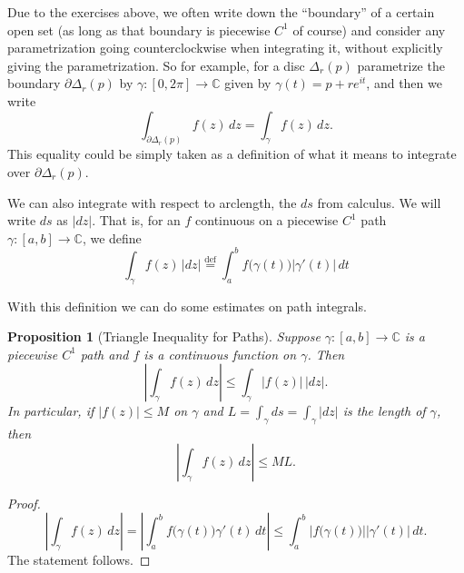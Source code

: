 \documentclass[12pt,openany]{book}
\newcommand{\sabs}[1]{\lvert {#1} \rvert}
\newcommand{\abs}[1]{\left\lvert {#1} \right\rvert}
\newcommand{\C}{{\mathbb{C}}}
\theoremstyle{plain}
\newtheorem{prop}[thm]{Proposition}
\theoremstyle{remark}
\theoremstyle{definition}
\theoremstyle{exercise}
\theoremstyle{example}
\begin{document}
Due to the exercises above,
we often write down the ``boundary'' of a certain open set
(as long as that boundary is piecewise $C^1$ of course)
and consider any parametrization going counterclockwise
when integrating it, without explicitly giving the parametrization.
So for example, for a disc $\Delta_r(p)$ parametrize
the boundary $\partial \Delta_r(p)$ by
$\gamma  \colon [0,2\pi] \to \C$ given by $\gamma(t) = p +
re^{it}$, and then we write
\begin{equation*}
\int_{\partial \Delta_r(p)} f(z) \, dz
=
\int_{\gamma} f(z) \, dz .
\end{equation*}
This equality could be simply taken as a definition of what it means to
integrate over $\partial \Delta_r(p)$.

\medskip

We can also integrate with respect to arclength, the $ds$ from calculus.
We will write $ds$ as $\sabs{dz}$.  That is, for an $f$ continuous on
a piecewise $C^1$ path $\gamma \colon [a,b] \to \C$,
we define
\begin{equation*}
\int_\gamma f(z) \, \sabs{dz}
\overset{\text{def}}{=}
\int_a^b f\bigl( \gamma(t) \bigr) \sabs{\gamma'(t)} \, dt
\end{equation*}

With this definition we can do some estimates on path integrals.

\begin{prop}[Triangle Inequality for Paths]
\pagebreak[2]
Suppose $\gamma \colon [a,b] \to \C$ is 
a piecewise $C^1$ path and $f$ is a continuous function on
$\gamma$.  Then
\begin{equation*}
\abs{\int_\gamma f(z) \, dz} \leq \int_\gamma \sabs{f(z)} \, \sabs{dz} .
\end{equation*}
In particular, if $\sabs{f(z)} \leq M$ on $\gamma$ and $L = \int_\gamma ds
= \int_{\gamma} \sabs{dz}$ is the length of $\gamma$, then
\begin{equation*}
\abs{\int_\gamma f(z) \, dz} \leq ML .
\end{equation*}
\end{prop} 

\begin{proof}
\begin{equation*}
\abs{\int_\gamma f(z) \, dz}
=
\abs{\int_a^b f\bigl( \gamma(t) \bigr) \gamma'(t) \, dt}
\leq
\int_a^b \abs{ f\bigl( \gamma(t) \bigr) }  \sabs{ \gamma'(t) } \, dt .
\end{equation*}
The statement follows.
\end{proof}
\end{document}
